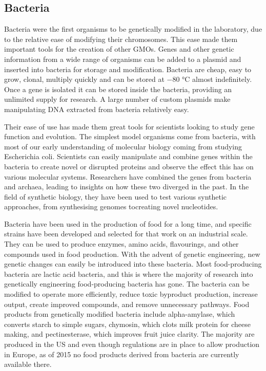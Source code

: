 \hypertarget{bacteria}{%
\subsection{Bacteria}\label{bacteria}}

Bacteria were the first organisms to be genetically modified in the laboratory, due to the relative ease of modifying their chromosomes. This ease made them important tools for the creation of other GMOs. Genes and other genetic information from a wide range of organisms can be added to a plasmid and inserted into bacteria for storage and modification. Bacteria are cheap, easy to grow, clonal, multiply quickly and can be stored at −80 °C almost indefinitely. Once a gene is isolated it can be stored inside the bacteria, providing an unlimited supply for research. A large number of custom plasmids make manipulating DNA extracted from bacteria relatively easy.

Their ease of use has made them great tools for scientists looking to study gene function and evolution. The simplest model organisms come from bacteria, with most of our early understanding of molecular biology coming from studying Escherichia coli. Scientists can easily manipulate and combine genes within the bacteria to create novel or disrupted proteins and observe the effect this has on various molecular systems. Researchers have combined the genes from bacteria and archaea, leading to insights on how these two diverged in the past. In the field of synthetic biology, they have been used to test various synthetic approaches, from synthesising genomes tocreating novel nucleotides.

Bacteria have been used in the production of food for a long time, and specific strains have been developed and selected for that work on an industrial scale. They can be used to produce enzymes, amino acids, flavourings, and other compounds used in food production. With the advent of genetic engineering, new genetic changes can easily be introduced into these bacteria. Most food-producing bacteria are lactic acid bacteria, and this is where the majority of research into genetically engineering food-producing bacteria has gone. The bacteria can be modified to operate more efficiently, reduce toxic byproduct production, increase output, create improved compounds, and remove unnecessary pathways. Food products from genetically modified bacteria include alpha-amylase, which converts starch to simple sugars, chymosin, which clots milk protein for cheese making, and pectinesterase, which improves fruit juice clarity. The majority are produced in the US and even though regulations are in place to allow production in Europe, as of 2015 no food products derived from bacteria are currently available there.

